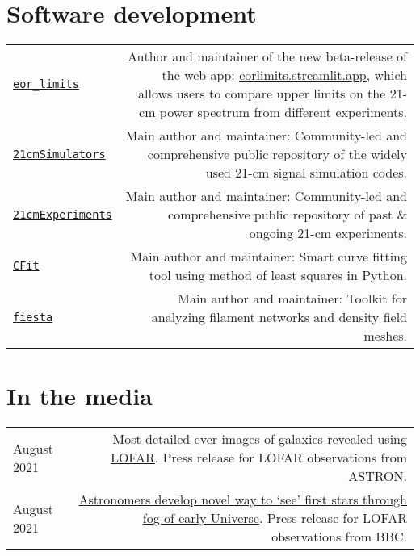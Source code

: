 \documentclass{article}
\begin{document}
\section*{Software development}

\begin{longtable}{L!{\vrule}R}
  \href{https://github.com/JitenDhandha/eor_limits}{\texttt{eor\_limits}} & Author and maintainer of the new beta-release of the web-app: \href{https://eorlimits.streamlit.app/}{eorlimits.streamlit.app}, which allows users to compare upper limits on the 21-cm power spectrum from different experiments.\\
  \href{https://github.com/JitenDhandha/21cmSimulators}{\texttt{21cmSimulators}} & Main author and maintainer: Community-led and comprehensive public repository of the widely used 21-cm signal simulation codes. \\
  \href{https://github.com/JitenDhandha/21cmExperiments}{\texttt{21cmExperiments}} & Main author and maintainer: Community-led and comprehensive public repository of past \& ongoing 21-cm experiments. \\
	\href{https://github.com/JitenDhandha/CFit}{\texttt{CFit}} & Main author and maintainer: Smart curve fitting tool using method of least squares in Python.\\
	\href{https://fiesta-astro.readthedocs.io}{\texttt{fiesta}} & Main author and maintainer: Toolkit for analyzing filament networks and density field meshes. \\
\end{longtable}

\section*{In the media}

\begin{longtable}{L!{\vrule}R}
	August 2021 & \href{https://www.astron.nl/most-detailed-ever-images-of-galaxies-revealed-using-lofar }{Most detailed-ever images of galaxies revealed using LOFAR}. Press release for LOFAR observations from ASTRON. \\
	August 2021 & \href{https://www.bbc.co.uk/news/science-environment-57998940}{Astronomers develop novel way to `see' first stars through fog of early Universe}. Press release for LOFAR observations from BBC. \\
\end{longtable}
\end{document}
